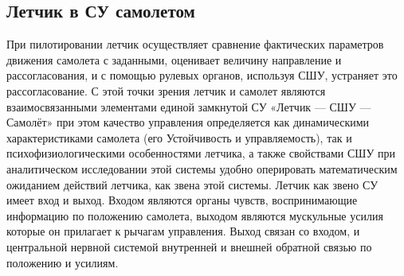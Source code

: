 \documentclass{article}
\begin{document}
\subsection{Летчик в СУ самолетом}
При пилотировании летчик осуществляет сравнение фактических параметров движения
самолета с заданными, оценивает величину направление и рассогласования, и с
помощью рулевых органов, используя СШУ, устраняет это рассогласование. С этой
точки зрения летчик и самолет являются взаимосвязанными элементами единой
замкнутой СУ «Летчик --- СШУ --- Самолёт» при этом качество управления
определяется как динамическими характеристиками самолета (его Устойчивость и
управляемость), так и психофизиологическими особенностями летчика, а также
свойствами СШУ при аналитическом исследовании этой системы удобно оперировать
математическим ожиданием действий летчика, как звена этой системы. Летчик как
звено СУ имеет вход и выход. Входом являются органы чувств, воспринимающие
информацию по положению самолета, выходом являются мускульные усилия которые он
прилагает к рычагам управления. Выход связан со входом, и центральной нервной
системой внутренней и внешней обратной связью по положению и усилиям.
\end{document}
